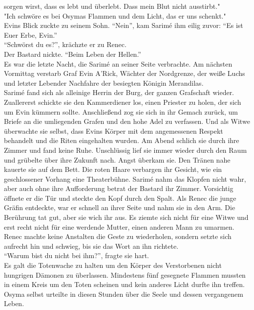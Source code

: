 sorgen wirst, dass es lebt und überlebt. Dass mein Blut nicht ausstirbt."\\
"Ich schwöre es bei Osymas Flammen und dem Licht, das er uns schenkt."\\
Evins Blick zuckte zu seinem Sohn. ``Nein'', kam Sarimé ihm eilig zuvor: ``Es ist Euer Erbe, 
Evin.''\\
``Schwörst du es?'', krächzte er zu Renec.\\
Der Bastard nickte. ``Beim Leben der Hellen.''\\
Es war die letzte Nacht, die Sarimé an seiner Seite verbrachte. Am nächsten Vormittag verstarb Graf 
Evin A’Rick, Wächter der Nordgrenze, der weiße Luchs und letzter Lebender Nachfahre der besiegten 
Königin Merandilas.\\


Sarimé fand sich als alleinige Herrin der Burg, der ganzen Grafschaft wieder. Zuallererst schickte 
sie den Kammerdiener los, einen Priester zu holen, der sich um Evin kümmern sollte. Anschließend 
zog sie sich in ihr Gemach zurück, um Briefe an die umliegenden Grafen und den hohe Adel zu 
verfassen. Und als Witwe überwachte sie selbst, dass Evins Körper mit dem angemessenen Respekt 
behandelt und die Riten eingehalten wurden. Am Abend schlich sie durch ihre Zimmer und fand keine 
Ruhe. Unschlüssig lief sie immer wieder durch den Raum und grübelte über ihre Zukunft nach. Angst 
überkam sie. Den Tränen nahe kauerte sie auf dem Bett. Die roten Haare verbargen ihr Gesicht, wie 
ein geschlossener Vorhang eine Theaterbühne. Sarimé nahm das Klopfen nicht wahr, aber auch ohne 
ihre Aufforderung betrat der Bastard ihr Zimmer. Vorsichtig öffnete er die Tür und steckte den 
Kopf durch den Spalt. Als Renec die junge Gräfin entdeckte, war er schnell an ihrer Seite und nahm 
sie in den Arm. Die Berührung tat gut, aber sie wich ihr aus. Es ziemte sich nicht für eine Witwe 
und erst recht nicht für eine werdende Mutter, einen anderen Mann zu umarmen. Renec machte keine 
Anstalten die Geste zu wiederholen, sondern setzte sich aufrecht hin und schwieg, bis sie das Wort 
an ihn richtete.\\
``Warum bist du nicht bei ihm?'', fragte sie hart.\\
Es galt die Totenwache zu halten um den Körper des Verstorbenen nicht hungrigen Dämonen zu 
überlassen. Mindestens fünf gesegnete Flammen mussten in einem Kreis um den Toten scheinen und kein 
anderes Licht durfte ihn treffen. Osyma selbst urteilte in diesen Stunden über die Seele und dessen 
vergangenem Leben.\\
